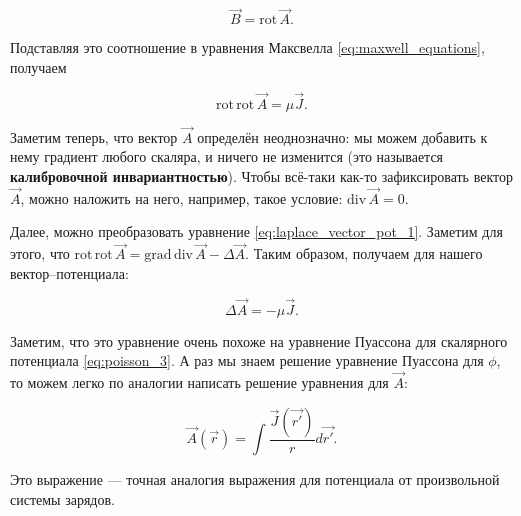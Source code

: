 \documentclass[11pt,a4paper]{article}
\numberwithin{equation}{section}
\newcommand{\grad}{\mathrm{grad}\,}
\newcommand{\rot}{\mathrm{rot}\,}
\renewcommand{\div}{\mathrm{div}\,}
\begin{document}
\begin{equation}
  \label{eq:def_vector_potential}
  \vec{B} = \rot \vec{A}.
\end{equation}

Подставляя это соотношение в уравнения Максвелла
\eqref{eq:maxwell_equations}, получаем 

\begin{equation}
  \label{eq:laplace_vector_pot_1}
  \rot \rot \vec{A} = \mu \vec{J}.
\end{equation}

Заметим теперь, что вектор $\vec{A}$ определён неоднозначно: мы можем
добавить к нему градиент любого скаляра, и ничего не изменится (это
называется \textbf{калибровочной инвариантностью}). Чтобы всё-таки
как-то зафиксировать вектор $\vec{A}$, можно наложить на него,
например, такое условие: $\div \vec{A} = 0$. 

Далее, можно преобразовать уравнение
\eqref{eq:laplace_vector_pot_1}. Заметим для этого, что $\rot \rot
\vec{A} = \grad \div \vec{A} - \Delta \vec{A}$. Таким образом,
получаем для нашего вектор--потенциала: 

\begin{equation}
  \label{eq:laplace_vector_pot_2}
  \Delta \vec{A} = - \mu \vec{J}. 
\end{equation}

Заметим, что это уравнение очень похоже на уравнение Пуассона для
скалярного потенциала \eqref{eq:poisson_3}. А раз мы знаем решение
уравнение Пуассона для $\phi$, то можем легко по аналогии написать
решение уравнения для $\vec{A}$: 

\begin{equation}
  \label{eq:solution_vector_pot}
  \vec{A}(\vec{r}) = \int \frac{\vec{J}(\vec{r'})}{r} d\vec{r'}.
\end{equation}

Это выражение --- точная аналогия выражения для потенциала от
произвольной системы зарядов. 
\end{document}
